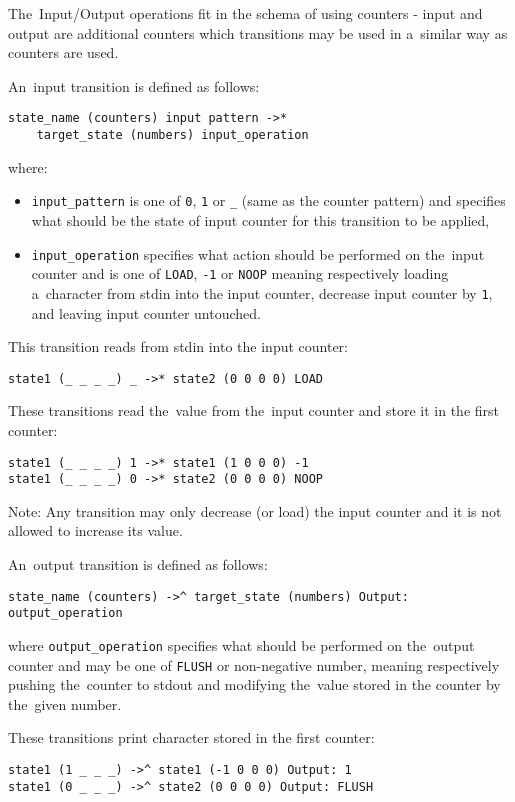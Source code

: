 \documentclass[english,shortabstract,mgr]{iithesis}
\begin{document}
The~Input/Output operations fit in the schema of using counters - input and output
are additional counters which transitions may be used in a~similar way as counters are used.

An~input transition is defined as follows:
\begin{verbatim}
state_name (counters) input pattern ->*
    target_state (numbers) input_operation
\end{verbatim}

where:
\begin{itemize}
  \item \texttt{input\_pattern} is one of \texttt{0}, \texttt{1} or \texttt{\_}
      (same as the counter pattern) and specifies what should be the state
      of input counter for this transition to be applied,
  \item \texttt{input\_operation} specifies what action should be performed
      on the~input counter and is one of \texttt{LOAD}, \texttt{-1} or \texttt{NOOP}
      meaning respectively loading a~character from stdin into the input counter,
      decrease input counter by \texttt{1}, and leaving input counter untouched.
\end{itemize}

This transition reads from stdin into the input counter:
\begin{verbatim}
state1 (_ _ _ _) _ ->* state2 (0 0 0 0) LOAD
\end{verbatim}

These transitions read the~value from the~input counter and store it in the first counter:
\begin{verbatim}
state1 (_ _ _ _) 1 ->* state1 (1 0 0 0) -1
state1 (_ _ _ _) 0 ->* state2 (0 0 0 0) NOOP
\end{verbatim}

Note: Any transition may only decrease (or load) the input counter
and it is not allowed to increase its value.

An~output transition is defined as follows:
\begin{verbatim}
state_name (counters) ->^ target_state (numbers) Output: output_operation
\end{verbatim}

where \texttt{output\_operation} specifies what should be performed on the~output
counter and may be one of \texttt{FLUSH} or non-negative number, meaning
respectively pushing the~counter to stdout and modifying the~value stored
in the counter by the~given number.

These transitions print character stored in the first counter:
\begin{verbatim}
state1 (1 _ _ _) ->^ state1 (-1 0 0 0) Output: 1
state1 (0 _ _ _) ->^ state2 (0 0 0 0) Output: FLUSH
\end{verbatim}
\end{document}
